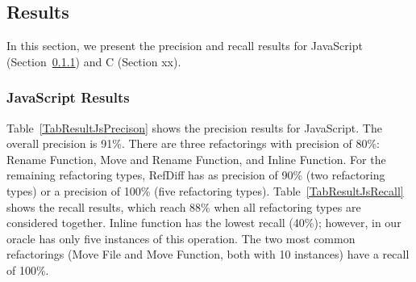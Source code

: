 \subsection{Results}
\label{sec:eval:js:c:results}

In this section, we present the precision and recall results for JavaScript (Section~\ref{sec:eval:js:c:results:js}) and C (Section xx).

\subsubsection{JavaScript Results}
\label{sec:eval:js:c:results:js}

Table~\ref{TabResultJsPrecison} shows the precision results for JavaScript. The overall precision is 91\%. There are three refactorings with precision of 80\%: Rename Function, Move and Rename Function, and Inline Function. For the remaining refactoring types, RefDiff has as precision of 90\% (two refactoring types) or a precision of 100\% (five refactoring types). Table~\ref{TabResultJsRecall} shows the recall results, which reach 88\% when all refactoring types are considered together.
Inline function has the lowest recall (40\%); however, in our oracle has only five instances of this operation. The two most common refactorings (Move File and Move Function, both with 10 instances) have a recall of 100\%.



